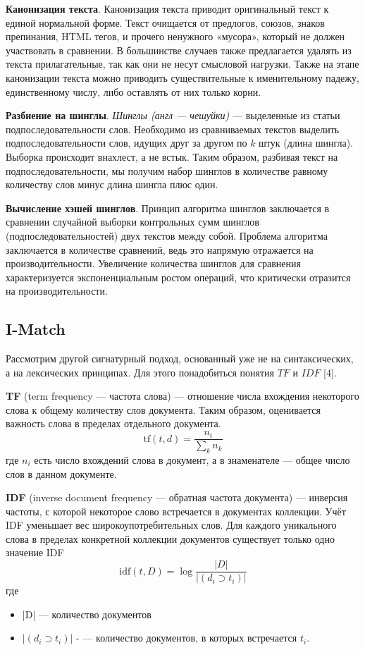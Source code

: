 \documentclass[a4paper,12pt,oneside]{article}
\begin{document}
\textbf{Канонизация текста}. Канонизация текста приводит оригинальный текст к единой нормальной форме. Текст очищается от предлогов, союзов, знаков препинания, HTML тегов, и прочего ненужного «мусора», который не должен участвовать в сравнении. В большинстве случаев также предлагается удалять из текста прилагательные, так как они не несут смысловой нагрузки.
Также на этапе канонизации текста можно приводить существительные к именительному падежу, единственному числу, либо оставлять от них только корни.

\textbf{Разбиение на шинглы}. \textit{Шинглы (англ — чешуйки)} — выделенные из статьи подпоследовательности слов. Необходимо из сравниваемых текстов выделить подпоследовательности слов, идущих друг за другом по $k$ штук (длина шингла). Выборка происходит внахлест, а не встык. Таким образом, разбивая текст на подпоследовательности, мы получим набор шинглов в количестве равному количеству слов минус длина шингла плюс один.

\textbf{Вычисление хэшей шинглов}. Принцип алгоритма шинглов заключается в сравнении случайной выборки контрольных сумм шинглов (подпоследовательностей) двух текстов между собой.
Проблема алгоритма заключается в количестве сравнений, ведь это напрямую отражается на производительности. Увеличение количества шинглов для сравнения характеризуется экспоненциальным ростом операций, что критически отразится на производительности.

\subsection{I-Match}

Рассмотрим другой сигнатурный подход, основанный уже не на синтаксических, а на лексических принципах. Для этого понадобиться понятия $TF$ и $IDF$ [4].

\textbf{TF} (term frequency — частота слова) — отношение числа вхождения некоторого слова к общему количеству слов документа. Таким образом, оценивается важность слова  в пределах отдельного документа.
\begin{equation} \mathrm{tf}(t,d) = \frac{n_i}{\sum_k n_k} \end{equation}
где $n_i$ есть число вхождений слова в документ, а в знаменателе — общее число слов в данном документе.

\textbf{IDF} (inverse document frequency — обратная частота документа) — инверсия частоты, с которой некоторое слово встречается в документах коллекции. Учёт IDF уменьшает вес широкоупотребительных слов. Для каждого уникального слова в пределах конкретной коллекции документов существует только одно значение IDF
\begin{equation} \mathrm{idf}(t, D) =  \log \frac{|D|}{|(d_{i}\supset t_{i})|} \end{equation}
где
\begin{itemize}
\item |D| — количество документов
\item $|(d_{i}\supset t_{i})|$ - — количество документов, в которых встречается $t_i$.
\end{itemize}
\end{document}
